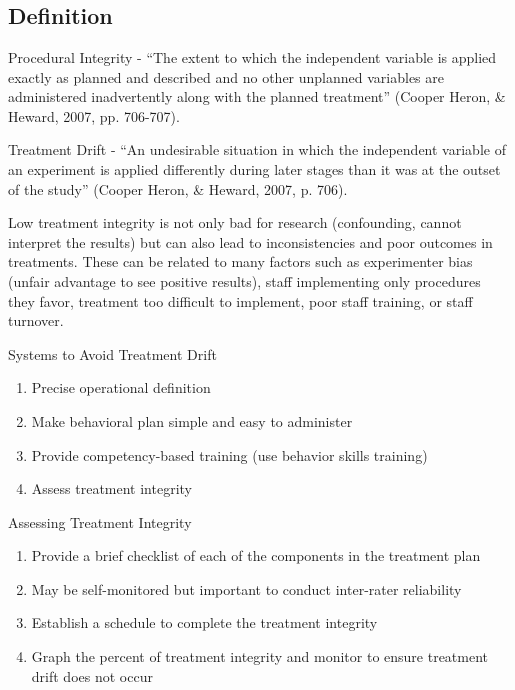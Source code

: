 \clearpage \section[\fourkFive{}]{\fourkFive{}%
              }
\subsection{Definition}
Procedural Integrity - ``The extent to which the independent variable is applied exactly as planned and described and no other unplanned variables are administered inadvertently along with the planned treatment'' (Cooper Heron, \& Heward, 2007, pp. 706-707).

Treatment Drift - ``An undesirable situation in which the independent variable of an experiment is applied differently during later stages than it was at the outset of the study'' (Cooper Heron, \& Heward, 2007, p. 706).

Low treatment integrity is not only bad for research (confounding, cannot interpret the results) but can also lead to inconsistencies and poor outcomes in treatments.  These can be related to many factors such as experimenter bias (unfair advantage to see positive results), staff implementing only procedures they favor, treatment too difficult to implement, poor staff training, or staff turnover.

Systems to Avoid Treatment Drift
\begin{enumerate}
\item Precise operational definition
\item Make behavioral plan simple and easy to administer
\item Provide competency-based training (use behavior skills training)
\item Assess treatment integrity
\end{enumerate}

Assessing Treatment Integrity
\begin{enumerate}
\item Provide a brief checklist of each of the components in the treatment plan
\item May be self-monitored but important to conduct inter-rater reliability
\item Establish a schedule to complete the treatment integrity
\item Graph the percent of treatment integrity and monitor to ensure treatment drift does not occur
\end{enumerate}
%
